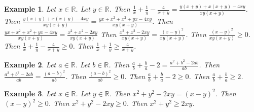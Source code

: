 \documentclass[12pt]{article}
\newtheorem{example}{Example}
\begin{document}
\begin{example}
    Let $x\in\mathbb{R}$. Let $y\in\mathbb{R}$. 
    Then $\frac{1}{x} + \frac{1}{y} - \frac{4}{x+y} = \frac{y(x+y) + x(x+y) - 4xy}{xy(x+y)}$.
    Then $\frac{y(x+y) + x(x+y) - 4xy}{xy(x+y)} = \frac{yx + x^2 + x^2 + yx - 4xy}{xy(x+y)}$.
    Then $\frac{yx + x^2 + x^2 + yx - 4xy}{xy(x+y)} = \frac{x^2 + x^2 -2xy}{xy(x+y)}$ %
    Then $\frac{x^2 + x^2 -2xy}{xy(x+y)} = \frac{{(x-y)}^2}{xy(x+y)}$.
    Then $\frac{{(x-y)}^2}{xy(x+y)} \ge 0$.
    Then $\frac{1}{x} + \frac{1}{y} - \frac{4}{x+y} \ge 0$.
    Then $\frac{1}{x} + \frac{1}{y} \ge \frac{4}{x+y}$.
\end{example}

\begin{example}
    Let $a\in\mathbb{R}$. Let $b\in\mathbb{R}$. 
    Then $\frac{a}{b} + \frac{b}{a} - 2 = \frac{a^2 + b^2 - 2ab}{ab}$.
    Then $\frac{a^2 + b^2 - 2ab}{ab} = \frac{{(a-b)}^2}{ab}$.
    Then $\frac{{(a-b)}^2}{ab} \ge 0$.
    Then $\frac{a}{b} + \frac{b}{a} - 2 \ge 0$.
    Then $\frac{a}{b} + \frac{b}{a} \ge 2$.
\end{example}

\begin{example}
    Let $x\in\mathbb{R}$. Let $y\in\mathbb{R}$. 
    Then $x^2 + y^2 - 2xy = {(x-y)}^2$. 
    Then ${(x-y)}^2 \ge 0$. 
    Then $x^2 + y^2 - 2xy \ge 0$. 
    Then $x^2 + y^2 \ge 2xy$.
\end{example}
\end{document}
